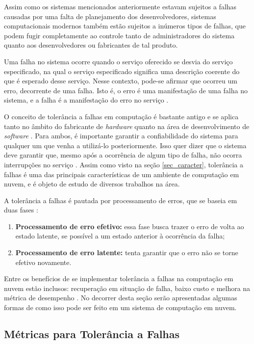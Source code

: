 \documentclass[
	12pt,				%
	oneside,			%
	a4paper,			%
	chapter=TITLE,		%
	english,			%
	french,				%
	spanish,			%
	brazil				%
	]{abntex2}
\begin{document}
Assim como os sistemas mencionados anteriormente estavam sujeitos a falhas causadas por uma falta de planejamento dos desenvolvedores, sistemas computacionais modernos também estão sujeitos a inúmeros tipos de falhas, que podem fugir completamente ao controle tanto de administradores do sistema quanto aos desenvolvedores ou fabricantes de tal produto.

Uma falha no sistema ocorre quando o serviço oferecido se desvia do serviço especificado, na qual o serviço especificado significa uma descrição coerente do que é esperado desse serviço. Nesse contexto, pode-se afirmar que ocorreu um erro, decorrente de uma falha. Isto é, o erro é uma manifestação de uma falha no sistema, e a falha é a manifestação do erro no serviço \cite{laprie1985dependable}.

O conceito de tolerância a falhas em computação é bastante antigo e se aplica tanto no âmbito do fabricante de \emph{hardware} quanto na área de desenvolvimento de \emph{software} \cite{randell1975system}. Para ambos, é importante garantir a confiabilidade do sistema para qualquer um que venha a utilizá-lo posteriormente. Isso quer dizer que o sistema deve garantir que, mesmo após a ocorrência de algum tipo de falha, não ocorra interrupções no serviço \cite{bala2012fault}. Assim como visto na seção \ref{sec_caracter}, tolerância a falhas é uma das principais características de um ambiente de computação em nuvem, e é objeto de estudo de diversos trabalhos na área.

A tolerância a falhas é pautada por processamento de erros, que se baseia em duas fases \cite{laprie1985dependable}:
\begin{enumerate}
    \item \textbf{Processamento de erro efetivo:} essa fase busca trazer o erro de volta ao estado latente, se possível a um estado anterior à ocorrência da falha;
    \item \textbf{Processamento de erro latente:} tenta garantir que o erro não se torne efetivo novamente.
\end{enumerate}

Entre os benefícios de se implementar tolerância a falhas na computação em nuvem estão inclusos: recuperação em situação de falha, baixo custo e melhora na métrica de desempenho \cite{patra2013fault}. No decorrer desta seção serão apresentadas algumas formas de como isso pode ser feito em um sistema de computação em nuvem.

\subsection{Métricas para Tolerância a Falhas}
\end{document}
